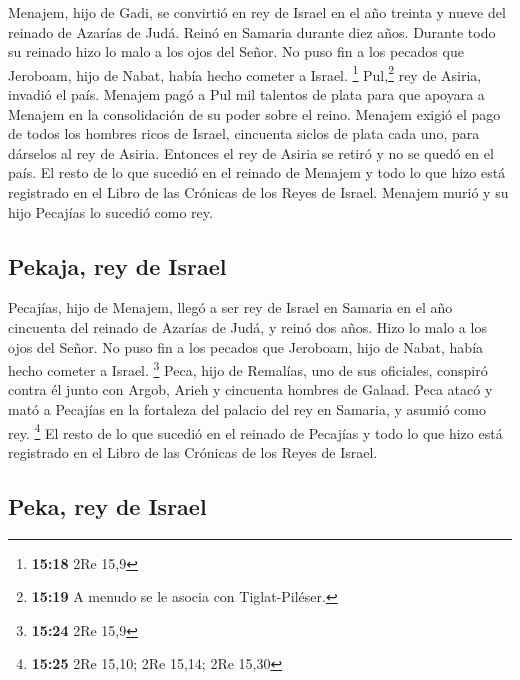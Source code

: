 Menajem, hijo de Gadi, se convirtió en rey de Israel en
el año treinta y nueve del reinado de Azarías de Judá. Reinó en Samaria
durante diez años.  Durante todo su reinado hizo lo malo
a los ojos del Señor. No puso fin a los pecados que Jeroboam, hijo de
Nabat, había hecho cometer a Israel. \footnote{\textbf{15:18} 2Re 15,9}
 Pul,\footnote{\textbf{15:19} A menudo se le asocia con
  Tiglat-Piléser.} rey de Asiria, invadió el país. Menajem pagó a Pul
mil talentos de plata para que apoyara a Menajem en la consolidación de
su poder sobre el reino.  Menajem exigió el pago de todos
los hombres ricos de Israel, cincuenta siclos de plata cada uno, para
dárselos al rey de Asiria. Entonces el rey de Asiria se retiró y no se
quedó en el país.  El resto de lo que sucedió en el
reinado de Menajem y todo lo que hizo está registrado en el Libro de las
Crónicas de los Reyes de Israel.  Menajem murió y su hijo
Pecajías lo sucedió como rey.

\hypertarget{pekaja-rey-de-israel}{%
\subsection{Pekaja, rey de Israel}\label{pekaja-rey-de-israel}}

 Pecajías, hijo de Menajem, llegó a ser rey de Israel en
Samaria en el año cincuenta del reinado de Azarías de Judá, y reinó dos
años.  Hizo lo malo a los ojos del Señor. No puso fin a
los pecados que Jeroboam, hijo de Nabat, había hecho cometer a Israel.
\footnote{\textbf{15:24} 2Re 15,9}  Peca, hijo de
Remalías, uno de sus oficiales, conspiró contra él junto con Argob,
Arieh y cincuenta hombres de Galaad. Peca atacó y mató a Pecajías en la
fortaleza del palacio del rey en Samaria, y asumió como rey. \footnote{\textbf{15:25}
  2Re 15,10; 2Re 15,14; 2Re 15,30}  El resto de lo que
sucedió en el reinado de Pecajías y todo lo que hizo está registrado en
el Libro de las Crónicas de los Reyes de Israel.

\hypertarget{peka-rey-de-israel}{%
\subsection{Peka, rey de Israel}\label{peka-rey-de-israel}}


